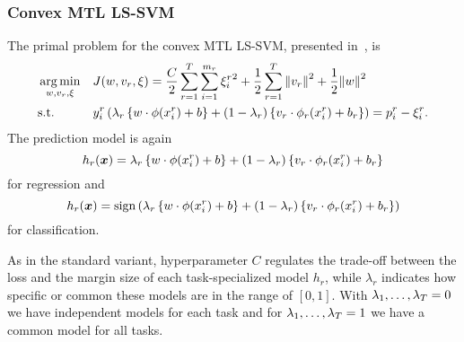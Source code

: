 \subsubsection{{Convex} MTL LS-SVM}
The primal problem for the convex MTL LS-SVM, presented in~\cite{RuizAD21}, is
\begin{equation}\label{eq:svmmtl_primal_convex_ls}
    \begin{aligned}
    & \argmin_{w, {v}_r, \xi}
    & & {J({w}, {v}_r, \xi) = \frac{C}{2} \sum_{r= 1}^T \sum_{i=1}^{m_r} {\xi_{i}^r}^2 + \frac{1}{2} \sum_{r= 1}^T{\norm{{v}_r}^2} + \frac{1}{2} {\norm{{w}}}^2} \\
    & \text{s.t.}
    & & y_{i}^r \left(\lambda_r \left\lbrace {w} \cdot \phi(x_{i}^r) + b  \right\rbrace + (1 - \lambda_r) \left\lbrace {v}_r \cdot \phi_r(x_{i}^r) + b_r \right\rbrace  \right) = p_{i}^r - \xi_{i}^r .  \\
    \end{aligned}
\end{equation}
The prediction model is again
\begin{equation}
    \nonumber
    h_r(\bm{x}) = \lambda_r \left\lbrace {w} \cdot \phi(x_{i}^r) + b  \right\rbrace + (1 - \lambda_r) \left\lbrace {v}_r \cdot \phi_r(x_{i}^r) + b_r \right\rbrace
\end{equation}
for regression and 
\begin{equation}
    \nonumber
    h_r(\bm{x}) = \operatorname{sign}{ \left(\lambda_r \left\lbrace {w} \cdot \phi(x_{i}^r) + b  \right\rbrace + (1 - \lambda_r) \left\lbrace {v}_r \cdot \phi_r(x_{i}^r) + b_r \right\rbrace \right)}
\end{equation}
for classification.
%

As in the standard variant, hyperparameter $C$ regulates the trade-off between the loss and the margin size of each task-specialized model $h_r$, while $\lambda_r$ indicates how specific or common these models are in the range of $[0, 1]$. With $\lambda_1, \ldots, \lambda_T=0$ we have independent models for each task and for $\lambda_1, \ldots, \lambda_T=1$ we have a common model for all tasks. 
 


